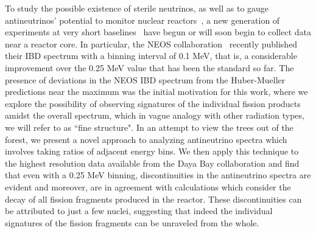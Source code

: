 \documentclass[twocolumn,amsmath,amssymb,10pt,superscriptaddress,a4paper,letterpaper,fleqn]{revtex4-1}
\begin{document}
To study the possible existence of sterile neutrinos, as well as to gauge antineutrinos' potential to monitor nuclear reactors~\cite{christensen14},
a new generation of experiments at very short baselines~\cite{prospect,nucifer,neos17} have begun or will soon begin to collect data near a reactor core.  
In particular, the NEOS collaboration~\cite{neos17}  recently published their IBD spectrum with a binning interval of 0.1 MeV, that is, a considerable improvement over the
0.25 MeV value that has been the standard so far.  
The presence of deviations in the NEOS IBD spectrum from the Huber-Mueller predictions near the maximum was the initial motivation for this work,
where we explore the possibility of observing  signatures of the individual fission products amidst the overall spectrum,
which in vague analogy with other radiation types, we will refer to as ``fine structure".
In an attempt to view the trees out of the forest, we present a novel approach to analyzing antineutrino spectra which involves taking ratios of adjacent 
energy bins.   
We then apply this technique to the highest resolution data available from the Daya Bay collaboration and find that even with a 0.25 MeV binning,  discontinuities in the antineutrino spectra are evident and moreover, are in agreement with calculations which consider the decay of all fission fragments produced in the reactor.  These discontinuities can be attributed to just a few nuclei, suggesting that indeed 
the individual signatures of the fission fragments can be unraveled from the whole. 
\end{document}
